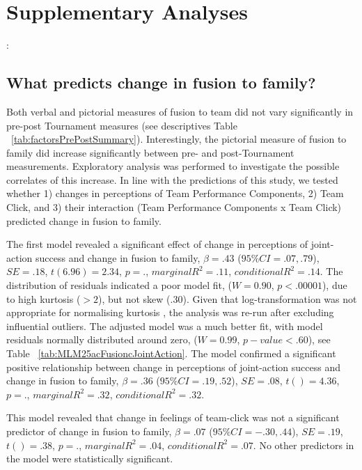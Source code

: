  \section{Supplementary Analyses}:

 \subsection{What predicts change in fusion to family?}
 Both verbal and pictorial measures of fusion to team did not vary significantly in pre-post Tournament measures (see descriptives Table ~\ref{tab:factorsPrePostSummary}).  Interestingly, the pictorial measure of fusion to family did increase significantly between pre- and post-Tournament measurements.  Exploratory analysis was performed to investigate the possible correlates of this increase. In line with the predictions of this study, we tested whether 1) changes in perceptions of Team Performance Components, 2) Team Click, and 3) their interaction (Team Performance Components x Team Click) predicted change in fusion to family.

 The first model revealed a significant effect of change in perceptions of joint-action success and change in fusion to family, $\beta = .43$ ($95\% CI =  .07, .79$), $SE = .18$, $t(6.96) = 2.34$, $p = .$, $marginal R^2 = .11$, $conditional R^2 = .14$.  The distribution of residuals indicated a poor model fit, ($W = 0.90$, $p < .00001$), due to high kurtosis ($> 2$), but not skew (.30). Given that log-transformation was not appropriate for normalising kurtosis \citep{Glass1972}, the analysis was re-run after excluding influential outliers.  The adjusted model was a much better fit, with model residuals normally distributed around zero, ($W = 0.99$, $p-value < .60$), see Table ~\ref{tab:MLM25acFusioncJointAction}. The model confirmed a significant positive relationship between change in perceptions of joint-action success and change in fusion to family, $\beta = .36$ ($95\% CI =  .19, .52$), $SE = .08$, $t() = 4.36$, $p = .$, $marginal R^2 = .32$, $conditional R^2 = .32$.

 


 This model revealed that change in feelings of team-click was not a significant predictor of change in fusion to family, $\beta = .07$ ($95\% CI =  -.30, .44$), $SE = .19$, $t() = .38$, $p = .$, $marginal R^2 = .04$, $conditional R^2 = .07$. No other predictors in the model were statistically significant.

